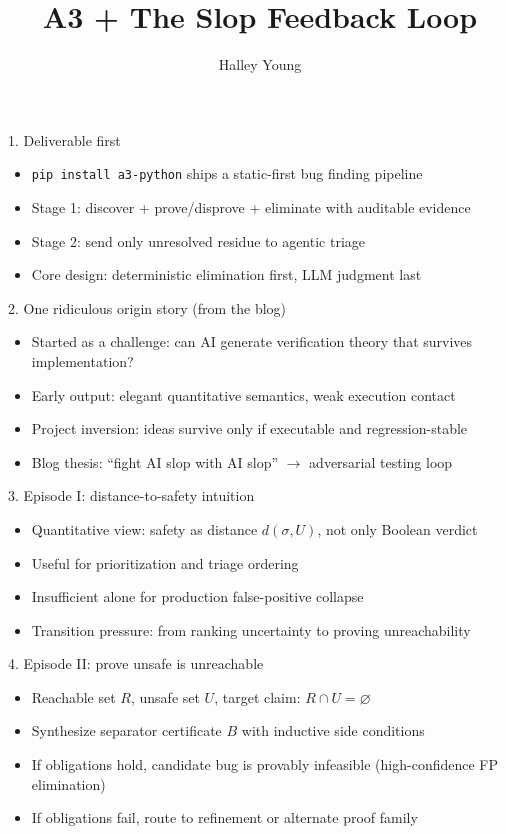 \documentclass[aspectratio=169]{beamer}
\title{A3 + The Slop Feedback Loop}
\author{Halley Young}
\begin{document}
\begin{frame}
\titlepage
\end{frame}

\begin{frame}{1. Deliverable first}
\begin{itemize}
  \item \texttt{pip install a3-python} ships a static-first bug finding pipeline
  \item Stage 1: discover + prove/disprove + eliminate with auditable evidence
  \item Stage 2: send only unresolved residue to agentic triage
  \item Core design: deterministic elimination first, LLM judgment last
\end{itemize}
\end{frame}

\begin{frame}{2. One ridiculous origin story (from the blog)}
\begin{itemize}
  \item Started as a challenge: can AI generate verification theory that survives implementation?
  \item Early output: elegant quantitative semantics, weak execution contact
  \item Project inversion: ideas survive only if executable and regression-stable
  \item Blog thesis: ``fight AI slop with AI slop'' \(\rightarrow\) adversarial testing loop
\end{itemize}
\end{frame}

\begin{frame}{3. Episode I: distance-to-safety intuition}
\begin{itemize}
  \item Quantitative view: safety as distance \(d(\sigma,U)\), not only Boolean verdict
  \item Useful for prioritization and triage ordering
  \item Insufficient alone for production false-positive collapse
  \item Transition pressure: from ranking uncertainty to proving unreachability
\end{itemize}
\end{frame}

\begin{frame}{4. Episode II: prove unsafe is unreachable}
\begin{itemize}
  \item Reachable set \(R\), unsafe set \(U\), target claim: \(R \cap U = \varnothing\)
  \item Synthesize separator certificate \(B\) with inductive side conditions
  \item If obligations hold, candidate bug is provably infeasible (high-confidence FP elimination)
  \item If obligations fail, route to refinement or alternate proof family
\end{itemize}
\end{frame}
\end{document}
